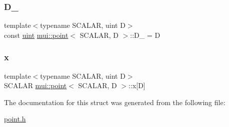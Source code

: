 \subsubsection{\texorpdfstring{D\+\_\+}{D\_}}
{\footnotesize\ttfamily template$<$typename S\+C\+A\+L\+AR, uint D$>$ \\
const \hyperlink{namespacemui_af15a3e7188a2117fb9965277bb0cacd2}{uint} \hyperlink{structmui_1_1point}{mui\+::point}$<$ S\+C\+A\+L\+AR, D $>$\+::D\+\_\+ = D\hspace{0.3cm}{\ttfamily [static]}}

\mbox{\label{structmui_1_1point_a839ca7be3c4811a7e325ac02c39d9e18}} 
\subsubsection{\texorpdfstring{x}{x}}
{\footnotesize\ttfamily template$<$typename S\+C\+A\+L\+AR, uint D$>$ \\
S\+C\+A\+L\+AR \hyperlink{structmui_1_1point}{mui\+::point}$<$ S\+C\+A\+L\+AR, D $>$\+::x\mbox{[}D\mbox{]}\hspace{0.3cm}{\ttfamily [protected]}}



The documentation for this struct was generated from the following file\+:\begin{DoxyCompactItemize}
\item 
\hyperlink{point_8h}{point.\+h}\end{DoxyCompactItemize}
